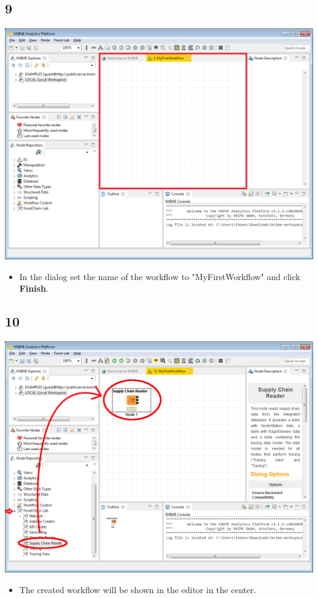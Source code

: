 \documentclass{beamer}
\begin{document}
\subsection{9}
\begin{frame}
	\begin{center}
  		\includegraphics[height=0.6\textheight]{9.png}
	\end{center}
	\begin{itemize}
		\item In the dialog set the name of the workflow to "MyFirstWorkflow" and click \textbf{Finish}.
	\end{itemize}
\end{frame}

\subsection{10}
\begin{frame}
	\begin{center}
  		\includegraphics[height=0.6\textheight]{10.png}
	\end{center}
	\begin{itemize}
		\item The created workflow will be shown in the editor in the center.
	\end{itemize}
\end{frame}
\end{document}
